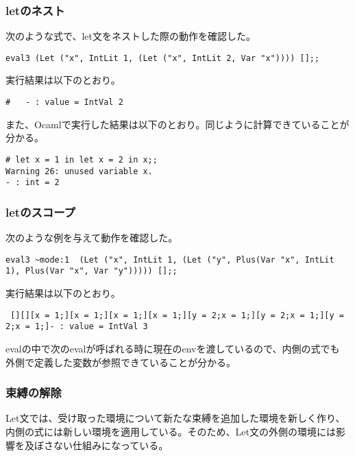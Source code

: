 \documentclass[a4paper,9pt]{jarticle}
\begin{document}
\subsubsection{letのネスト}
次のような式で、let文をネストした際の動作を確認した。
\begin{lstlisting}
eval3 (Let ("x", IntLit 1, (Let ("x", IntLit 2, Var "x")))) [];;
\end{lstlisting}
実行結果は以下のとおり。
\begin{lstlisting}
#   - : value = IntVal 2
\end{lstlisting}

また、Ocamlで実行した結果は以下のとおり。同じように計算できていることが
分かる。
\begin{lstlisting}
# let x = 1 in let x = 2 in x;;
Warning 26: unused variable x.
- : int = 2
\end{lstlisting}

\subsubsection{letのスコープ}
次のような例を与えて動作を確認した。

\begin{lstlisting}
eval3 ~mode:1  (Let ("x", IntLit 1, (Let ("y", Plus(Var "x", IntLit 1), Plus(Var "x", Var "y"))))) [];;
\end{lstlisting}

実行結果は以下のとおり。
\begin{lstlisting}
 [][][x = 1;][x = 1;][x = 1;][x = 1;][y = 2;x = 1;][y = 2;x = 1;][y = 2;x = 1;]- : value = IntVal 3
\end{lstlisting}

evalの中で次のevalが呼ばれる時に現在のenvを渡しているので、内側の式でも
外側で定義した変数が参照できていることが分かる。

\subsubsection{束縛の解除}
Let文では、受け取った環境について新たな束縛を追加した環境を新しく作り、
内側の式には新しい環境を適用している。そのため、Let文の外側の環境には影
響を及ぼさない仕組みになっている。
\newpage
\end{document}
